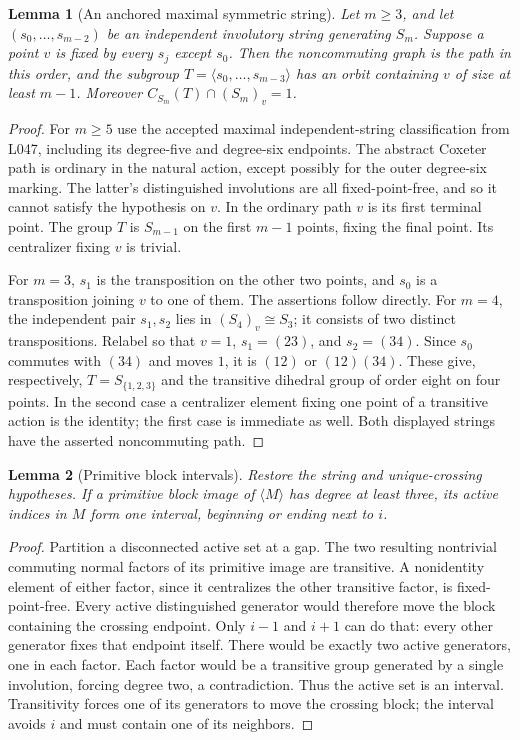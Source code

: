 \documentclass[11pt,a4paper]{article}
\newtheorem{lemma}{Lemma}
\newcommand{\gen}[1]{\langle#1\rangle}
\begin{document}
\begin{lemma}[An anchored maximal symmetric string]\label{anchored}
Let $m\geq3$, and let $(s_0,\ldots,s_{m-2})$ be an independent
involutory string generating $S_m$. Suppose a point $v$ is fixed
by every $s_j$ except $s_0$. Then the noncommuting graph is the
path in this order, and the subgroup
$T=\gen{s_0,\ldots,s_{m-3}}$ has an orbit containing $v$
of size at least $m-1$. Moreover
$C_{S_m}(T)\cap(S_m)_v=1$.
\end{lemma}
\begin{proof}
For $m\geq5$ use the accepted maximal independent-string
classification from L047, including its degree-five and
 degree-six endpoints. The abstract Coxeter path is ordinary
in the natural action, except possibly for the outer degree-six
marking. The latter's distinguished involutions are all
fixed-point-free, and so it cannot satisfy the hypothesis on
$v$. In the ordinary path $v$ is its first terminal point.
The group $T$ is $S_{m-1}$ on the first $m-1$ points, fixing
the final point. Its centralizer fixing $v$ is trivial.

For $m=3$, $s_1$ is the transposition on the other two points,
and $s_0$ is a transposition joining $v$ to one of them. The
assertions follow directly. For $m=4$, the independent pair
$s_1,s_2$ lies in $(S_4)_v\cong S_3$; it consists of two
distinct transpositions. Relabel so that $v=1$, $s_1=(23)$,
and $s_2=(34)$. Since $s_0$ commutes with $(34)$ and moves
$1$, it is $(12)$ or $(12)(34)$. These give, respectively,
$T=S_{\{1,2,3\}}$ and the transitive dihedral group of order
eight on four points. In the second case a centralizer element
fixing one point of a transitive action is the identity; the
first case is immediate as well. Both displayed strings have
the asserted noncommuting path.
\end{proof}

\begin{lemma}[Primitive block intervals]\label{interval}
Restore the string and unique-crossing hypotheses. If a primitive
block image of $\gen M$ has degree at least three, its active
indices in $M$ form one interval, beginning or ending next to $i$.
\end{lemma}
\begin{proof}
Partition a disconnected active set at a gap. The two resulting
nontrivial commuting normal factors of its primitive image are
transitive. A nonidentity element of either factor, since it
centralizes the other transitive factor, is fixed-point-free.
Every active distinguished generator would therefore move the
block containing the crossing endpoint. Only $i-1$ and $i+1$
can do that: every other generator fixes that endpoint itself.
There would be exactly two active generators, one in each
factor. Each factor would be a transitive group generated by a
single involution, forcing degree two, a contradiction. Thus
the active set is an interval. Transitivity forces one of its
generators to move the crossing block; the interval avoids $i$
and must contain one of its neighbors.
\end{proof}
\end{document}
